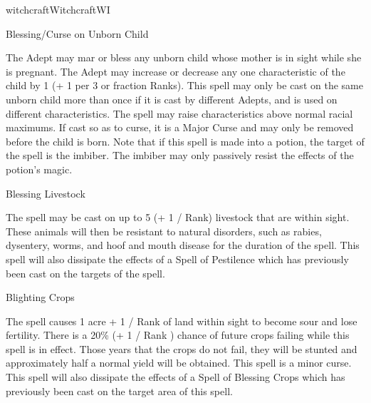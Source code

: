 \begin{College}[1.1]{witchcraft}{Witchcraft}{WI}
\begin{spell}[S-2]{Blessing/Curse on Unborn Child}
\begin{effects}
The Adept may mar or bless any unborn child whose mother is in sight
while she is pregnant. The Adept may increase or decrease any one
characteristic of the child by 1 (+ 1 per 3 or fraction Ranks).  This
spell may only be cast on the same unborn child more than once if it
is cast by different Adepts, and is used on different characteristics.
The spell may raise characteristics above normal racial maximums. If
cast so as to curse, it is a Major Curse and may only be removed
before the child is born. Note that if this spell is made into a
potion, the target of the spell is the imbiber.  The imbiber may only
passively resist the effects of the potion’s magic.
\end{effects}
\end{spell}

\begin{spell}[S-3]{Blessing Livestock}

\begin{effects}
The spell may be cast on up to 5 (+ 1 / Rank) livestock that are
within sight.  These animals will then be resistant to natural
disorders, such as rabies, dysentery, worms, and hoof and mouth
disease for the duration of the spell.  This spell will also dissipate
the effects of a Spell of Pestilence which has previously been cast on
the targets of the spell.
\end{effects}
\end{spell}

\begin{spell}[S-4]{Blighting Crops}

\begin{effects}
The spell causes 1 acre + 1 / Rank of land within sight to become sour
and lose fertility.  There is a 20\% (+ 1 / Rank ) chance of future
crops failing while this spell is in effect. Those years that the
crops do not fail, they will be stunted and approximately half a
normal yield will be obtained.  This spell is a minor curse.  This
spell will also dissipate the effects of a Spell of Blessing Crops
which has previously been cast on the target area of this spell.
\end{effects}
\end{spell}


\end{College}
